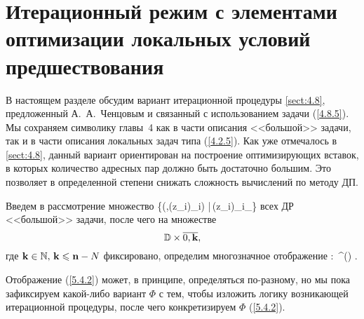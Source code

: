 
\section{
  Итерационный режим
  с элементами оптимизации
  локальных условий предшествования
}
\label{sect:5.4}
\setcounter{equation}{0}

В настоящем разделе обсудим вариант итерационной процедуры \ref{sect:4.8},
предложенный А.~А.~Ченцовым и связанный с использованием задачи (\ref{4.8.5}).
Мы сохраняем символику главы~4 как в части описания <<большой>> задачи,
так и в части описания локальных задач типа (\ref{4.2.5}).
Как уже отмечалось в \ref{sect:4.8},
данный вариант ориентирован на построение оптимизирующих вставок,
в которых количество адресных пар должно быть достаточно большим.
Это позволяет в определенной степени снижать сложность вычислений по методу ДП.

Введем в рассмотрение множество
\bfn
  \label{5.4.1}
  \bbd \df \bigl\{\bigl(\al,(z_i)_{i\in{}})\in \ca
  \times {}|\,(z_i)_{i\in{}}\in {}_\al\bigl\}
\efn
всех ДР <<большой>> задачи,
после чего на множестве
$$
  \bbd \times \ov{0,\mathbf{k}}
  ,
$$
где
$\mathbf{k}\in {\mathbb N},\,\mathbf{k}\leqslant {\mathbf n}-N$
фиксировано,
определим многозначное отображение
\bfn
  \label{5.4.2}
  \Phi:\,\bbd\times {}\longrightarrow
  \cp^\prime()
  .
\efn

Отображение (\ref{5.4.2}) может, в принципе, определяться по-разному,
но мы пока зафиксируем какой-либо вариант $\Phi$ с тем,
чтобы изложить логику возникающей итерационной процедуры,
после чего конкретизируем $\Phi$
(\ref{5.4.2}).

